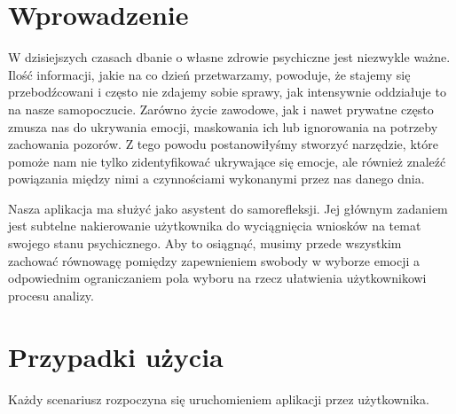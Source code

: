 \documentclass[inz, shortabstract]{iithesis}
\author         {Aleksandra Nicpoń \and Martyna Wybraniec}
\begin{document}

\chapter{Wprowadzenie}
W dzisiejszych czasach dbanie o własne zdrowie psychiczne jest niezwykle ważne. Ilość informacji, jakie na co dzień przetwarzamy, powoduje, że stajemy się przebodźcowani i często nie zdajemy sobie sprawy, jak intensywnie oddziałuje to na nasze samopoczucie. Zarówno życie zawodowe, jak i nawet prywatne często zmusza nas do ukrywania emocji, maskowania ich lub ignorowania na potrzeby zachowania pozorów. Z tego powodu postanowiłyśmy stworzyć narzędzie, które pomoże nam nie tylko zidentyfikować ukrywające się emocje, ale również znaleźć powiązania między nimi a czynnościami wykonanymi przez nas danego dnia.

Nasza aplikacja ma służyć jako asystent do samorefleksji. Jej głównym zadaniem jest subtelne nakierowanie użytkownika do wyciągnięcia wniosków na temat swojego stanu psychicznego. Aby to osiągnąć, musimy przede wszystkim zachować równowagę pomiędzy zapewnieniem swobody w wyborze emocji a odpowiednim ograniczaniem pola wyboru na rzecz ułatwienia użytkownikowi procesu analizy.

\chapter{Przypadki użycia}

Każdy scenariusz rozpoczyna się uruchomieniem aplikacji przez użytkownika.
\end{document}

